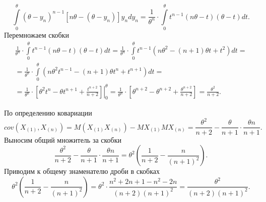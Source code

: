 \begin{enumerate}[label=\alph*)]
$$  \int \limits_0^{ \theta }
    \left( \theta - y_n \right)^{n - 1} \left[ n \theta - \left( \theta - y_n \right) \right] y_n
  dy_n =
  \frac{1}{ \theta^n} \cdot
  \int \limits_0^{ \theta } t^{n - 1} \left( n \theta - t \right) \left( \theta - t \right) dt.$$
Перемножаем скобки
\begin{equation*}
  \begin{split}
    \frac{1}{ \theta^n} \cdot
    \int \limits_0^{ \theta } t^{n - 1} \left( n \theta - t \right) \left( \theta - t \right) dt =
    \frac{1}{ \theta^n} \cdot
    \int \limits_0^{ \theta }
      t^{n - 1} \left( n \theta^2 - \left( n + 1 \right) \theta t + t^2 \right)
    dt = \\
    = \frac{1}{ \theta^n} \cdot
    \int \limits_0^{ \theta }
      \left( n \theta^2 t^{n - 1} - \left( n + 1 \right) \theta t^n + t^{n + 1} \right)
    dt = \\
    = \frac{1}{ \theta^n} \cdot
    \left.
      \left[ \theta^2 t^n - \theta t^{n + 1} + \frac{t^{n + 2}}{n + 2} \right]
    \right|_0^{ \theta } =
    \frac{1}{ \theta^n} \cdot
    \left[ \theta^{n + 2} - \theta^{n + 2} + \frac{ \theta^{n + 2}}{n + 2} \right] =
    \frac{ \theta^2}{n + 2}.
  \end{split}
\end{equation*}

По определению ковариации
$$cov \left( X_{ \left( 1 \right) }, X_{ \left( n \right) } \right) =
  M \left( X_{ \left( 1 \right) } X_{ \left( n \right) } \right) -
  MX_{ \left( 1 \right) } MX_{ \left( n \right) } =
  \frac{ \theta^2}{n + 2} - \frac{ \theta }{n + 1} \cdot \frac{ \theta n}{n + 1}.$$
Выносим общий множитель за скобки
$$ \frac{ \theta^2}{n + 2} - \frac{ \theta }{n + 1} \cdot \frac{ \theta n}{n + 1} =
  \theta^2 \left( \frac{1}{n + 2} - \frac{n}{ \left( n + 1 \right)^2} \right).$$
Приводим к общему знаменателю дроби в скобках
$$ \theta^2 \left( \frac{1}{n + 2} - \frac{n}{ \left( n + 1 \right)^2} \right) =
  \theta^2 \cdot \frac{n^2 + 2n + 1 - n^2 - 2n}{ \left( n + 2 \right) \left( n + 1 \right)^2} =
  \frac{ \theta^2}{ \left( n + 2 \right) \left( n + 1 \right)^2}.$$
\end{enumerate}

